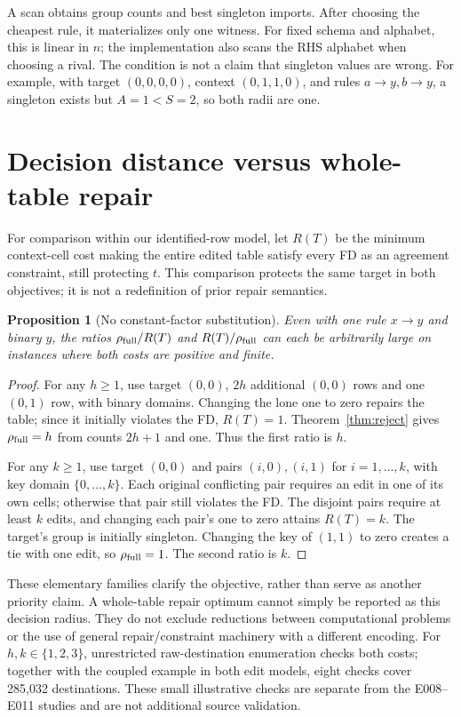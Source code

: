 \documentclass[11pt]{article}
\newtheorem{proposition}{Proposition}
\begin{document}
A scan obtains group counts and best singleton imports. After choosing the
cheapest rule, it materializes only one witness. For fixed schema and alphabet,
this is linear in $n$; the implementation also scans the RHS alphabet when
choosing a rival. The condition is not a claim that singleton values are wrong.
For example, with target $(0,0,0,0)$, context $(0,1,1,0)$, and rules
$a\to y,b\to y$, a singleton exists but $A=1<S=2$, so both radii are one.


\section{Decision distance versus whole-table repair}
For comparison within our identified-row model, let $R(T)$ be the minimum
context-cell cost making the entire edited table satisfy every FD as an
agreement constraint, still protecting $t$. This comparison protects the same
target in both objectives; it is not a redefinition of prior repair semantics.
\begin{proposition}[No constant-factor substitution]\label{prop:separation}
Even with one rule $x\to y$ and binary $y$, the ratios
$\rho_{\rm full}/R(T)$ and $R(T)/\rho_{\rm full}$ can each be arbitrarily large
on instances where both costs are positive and finite.
\end{proposition}
\begin{proof}
For any $h\geq1$, use target $(0,0)$, $2h$ additional $(0,0)$ rows and one
$(0,1)$ row, with binary domains. Changing the lone one to zero repairs the
table; since it initially violates the FD, $R(T)=1$.
Theorem~\ref{thm:reject} gives $\rho_{\rm full}=h$ from counts $2h+1$ and one.
Thus the first ratio is $h$.

For any $k\geq1$, use target $(0,0)$ and pairs $(i,0),(i,1)$ for
$i=1,\ldots,k$, with key domain $\{0,\ldots,k\}$.
Each original conflicting pair requires an edit in one of its own cells;
otherwise that pair still violates the FD. The disjoint pairs require at
least $k$ edits, and changing each pair's one to zero attains $R(T)=k$.
The target's group is initially singleton. Changing the key of $(1,1)$ to
zero creates a tie with one edit, so $\rho_{\rm full}=1$.
The second ratio is $k$.
\end{proof}
These elementary families clarify the objective, rather than serve as another
priority claim. A whole-table repair optimum cannot simply be reported as this
decision radius. They do not exclude reductions between computational problems
or the use of general repair/constraint machinery with a different encoding.
For $h,k\in\{1,2,3\}$, unrestricted raw-destination enumeration checks both
costs; together with the coupled example in both edit models, eight checks
cover 285,032 destinations. These small illustrative checks are separate from
the E008--E011 studies and are not additional source validation.
\end{document}
